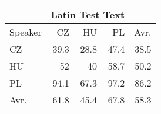 \begin{tabular}{l|rrr|r}
\hline
 & \multicolumn{3}{c}{Latin Test Text} & \\
\hline
 Speaker   &   CZ &   HU &   PL &   Avr. \\
\hline
 CZ        & 39.3 & 28.8 & 47.4 &   38.5 \\
 HU        & 52   & 40   & 58.7 &   50.2 \\
 PL        & 94.1 & 67.3 & 97.2 &   86.2 \\
\hline
 Avr.     & 61.8 & 45.4 & 67.8 &   58.3 \\
\hline
\end{tabular}